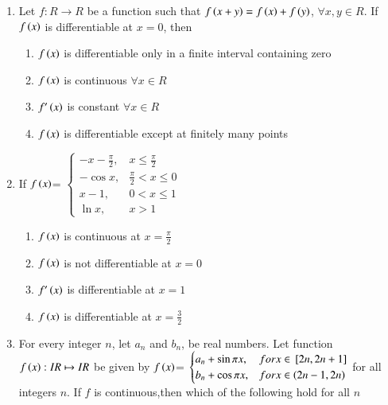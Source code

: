 \documentclass[journal,12pt,twocolumn]{IEEEtran}
\theoremstyle{remark}
\begin{document}
\begin{enumerate}
    \item 
    {Let $f:R \to R$ be a function such that $f\left(x+y\right)=f\left(x\right)+f\left(y\right)$, $\forall x,y\in R$. If $f\left(x\right)$ is differentiable at $x=0$, then} 

    \hfill 
    {}
    
    \begin{enumerate}[label=(\alph*)]
        
        \item $f\left(x\right)$ is differentiable only in a finite interval containing zero 
        \item $f\left(x\right)$ is continuous $\forall x\in R$
        \item $f'\left(x\right)$ is constant $\forall x\in R$
        \item $f\left(x\right)$ is differentiable except at finitely many points 
    \end{enumerate}


    \item 
    {If $f\left(x\right)$= 
    $\begin{cases}
        -x-\frac{\pi}{2}, & x\leq \frac{\pi}{2} \\
        -\cos x, & \frac{\pi}{2}<x\leq 0 \\
        x-1, & 0<x\leq1 \\
        \ln x, & x>1
    \end{cases}$} 

    \hfill 
    {}
    
    \begin{enumerate}[label=(\alph*)]
        
        \item $f\left(x\right)$ is continuous at $x=\frac{\pi}{2}$
        \item $f\left(x\right)$ is not differentiable at $x=0$
        \item $f'\left(x\right)$ is differentiable at $x=1$
        \item $f\left(x\right)$ is differentiable at $x=\frac{3}{2}$
    \end{enumerate}


    \item 
    {For every integer $n$, let $a_n$ and $b_n$, be real numbers. Let function $f\left(x\right): IR \mapsto IR$ be given by
    $f\left(x\right)$= 
    $\begin{cases}
       a_n+\sin\pi x, & for x\in {}\left[2n,2n+1\right] \\
       b_n+\cos\pi x, & for x\in \left(2n-1,2n\right)
    \end{cases}$
    for all integers $n$. If $f$ is continuous,then which of the following hold for all $n$} 


\end{enumerate}
\end{document}

